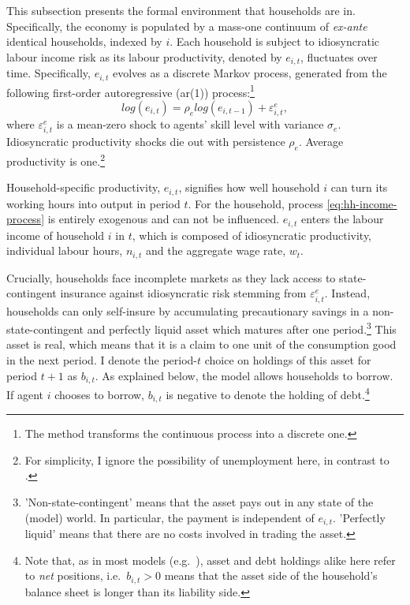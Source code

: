 \documentclass[12pt]{article} %
\numberwithin{equation}{section} %
\begin{document}
This subsection presents the formal environment that households are in. Specifically, the economy is populated by a mass-one continuum of \textit{ex-ante} identical households, indexed by $i$. Each household is subject to idiosyncratic labour income risk as its labour productivity, denoted by $e_{i,t}$, fluctuates over time. Specifically, $e_{i,t}$ evolves as a discrete Markov process, generated from the following first-order autoregressive (\Gls{ar}(1)) process:\footnote{The \textcite{rouwenhorst1995} method transforms the continuous process into a discrete one.}
\begin{equation}
    log(e_{i,t}) = \rho_e log(e_{i,t-1}) + \varepsilon^e_{i,t}, \label{eq:hh-income-process}
\end{equation}
where $\varepsilon^e_{i,t}$ is a mean-zero shock to agents' skill level with variance $\sigma_e$. Idiosyncratic productivity shocks die out with persistence $\rho_e$. Average productivity is one.\footnote{For simplicity, I ignore the possibility of unemployment here, in contrast to \textcite{gl2017}.}

Household-specific productivity, $e_{i,t}$, signifies how well household $i$ can turn its working hours into output in period $t$. For the household, process \eqref{eq:hh-income-process} is entirely exogenous and can not be influenced. $e_{i,t}$ enters the labour income of household $i$ in $t$, which is composed of idiosyncratic productivity, individual labour hours, $n_{i,t}$ and the aggregate wage rate, $w_t$.

Crucially, households face incomplete markets as they lack access to state-contingent insurance against idiosyncratic risk stemming from $\varepsilon^e_{i,t}$. Instead, households can only self-insure by accumulating precautionary savings in a non-state-contingent and perfectly liquid asset which matures after one period.\footnote{'Non-state-contingent' means that the asset pays out in any state of the (model) world. In particular, the payment is independent of $e_{i,t}$. 'Perfectly liquid' means that there are no costs involved in trading the asset.} This asset is real, which means that it is a claim to one unit of the consumption good in the next period. I denote the period-$t$ choice on holdings of this asset for period $t+1$ as $b_{i,t}$. As explained below, the model allows households to borrow. If agent $i$ chooses to borrow, $b_{i,t}$ is negative to denote the holding of debt.\footnote{Note that, as in most models (e.g.~\cite{kaplan2018}), asset and debt holdings alike here refer to \textit{net} positions, i.e.~$b_{i,t} > 0$ means that the asset side of the household's balance sheet is longer than its liability side.}
\end{document}
